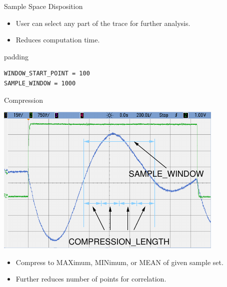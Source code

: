 \documentclass[final]{beamer}
\begin{document}
\begin{frame}[fragile]{}
\begin{columns}[t]
\begin{column}{.31\linewidth}
\begin{block}{Sample Space Disposition}
\begin{minipage}[t]{0.49\linewidth}
          \vspace{-6cm}%
          \begin{itemize}
            \item User can select any part of the trace for further analysis.
            \item Reduces computation time.
          \end{itemize} 
          \begin{center}
            \begin{beamercolorbox}[rounded=true]{padding}%
               \footnotesize%
              \begin{lstlisting}
WINDOW_START_POINT = 100
SAMPLE_WINDOW = 1000
              \end{lstlisting}
            \end{beamercolorbox}
          \end{center}
        \end{minipage}
       \end{block}
       \begin{block}{Compression}
        \begin{minipage}[t]{0.49\linewidth}
		\includegraphics[width=0.9\linewidth]{../figures/oscilloscope-compression-window}
        \end{minipage}%
        \begin{minipage}[t]{0.49\linewidth}%
          \vspace{-6.5cm}%
         \begin{itemize}
           \item Compress to MAXimum, MINimum, or MEAN of given sample set.
           \item Further reduces number of points for correlation.

\end{itemize}
\end{minipage}
\end{block}
\end{column}
\end{columns}
\end{frame}
\end{document}
